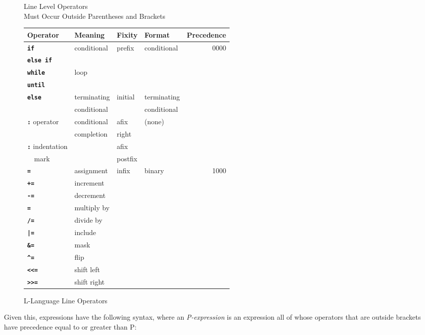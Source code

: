 \documentclass[12pt]{article}
\newcommand{\ttkey}[1]{{\tt \bfseries #1}}
\newlength{\figurewidth}
\newenvironment{boxedfigure}[1][!btp]%
	{\begin{figure*}[#1]
	 \begin{lrbox}{\figurebox}
	 \begin{minipage}{\figurewidth}

	 \vspace*{1ex}}%
	{
	 \vspace*{1ex}

	 \end{minipage}
	 \end{lrbox}

	 \centering
	 \fbox{\hspace*{0.1in}\usebox{\figurebox}\hspace*{0.1in}}
	 \end{figure*}}
\begin{document}
\begin{boxedfigure}[!t]
\begin{center}
Line Level Operators \\
Must Occur Outside Parentheses and Brackets
\\[1ex]
\begin{tabular}{|l|l|l|l|r|}
\hline
Operator & Meaning & Fixity & Format & Precedence \\
\hline
\ttkey{if} & conditional & prefix & conditional & 0000
\\\cline{1-1}
\ttkey{else if} & & & &
\\\cline{1-2}
\ttkey{while} & loop & & &
\\\cline{1-1}
\ttkey{until} & & & &
\\\cline{1-4}
\ttkey{else} & terminating & initial & terminating & \\
             & conditional & & conditional &
\\\cline{1-4}
\ttkey{:} operator & conditional & afix & (none) & \\
                   & completion & right & &
\\\cline{1-1}\cline{3-3}
\ttkey{:} indentation & & afix & & \\
~~mark                & & postfix & &
\\\hline
\ttkey{=} & assignment & infix & binary & 1000
\\\cline{1-2}
\ttkey{+=} & increment & & &
\\\cline{1-2}
\ttkey{-=} & decrement & & &
\\\cline{1-2}
\ttkey{*=} & multiply by & & &
\\\cline{1-2}
\ttkey{/=} & divide by & & &
\\\cline{1-2}
\ttkey{|=} & include & & &
\\\cline{1-2}
\ttkey{\&=} & mask & & &
\\\cline{1-2}
\ttkey{\textasciicircum=} & flip & & &
\\\cline{1-2}
\ttkey{<{}<=} & shift left & & &
\\\cline{1-2}
\ttkey{>{}>=} & shift right & & &
\\\hline
\end{tabular}
\end{center}

\caption{L-Language Line Operators}
\label{L-LANGUAGE-LINE-OPERATORS}
\end{boxedfigure}

\newpage

Given this, expressions have the following syntax,
where an {\em P-expression}
is an expression all of whose operators that are outside brackets
have precedence equal to or greater than P:
\end{document}
